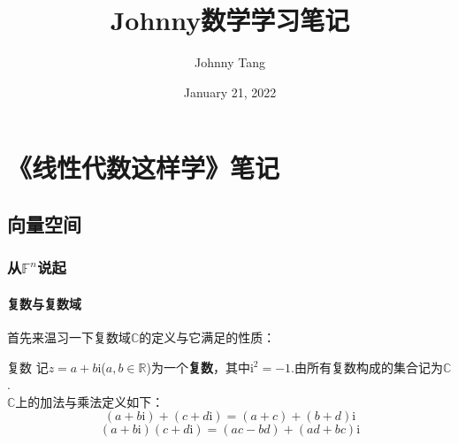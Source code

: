 \documentclass[lang=cn, zihao=5]{elegantbook}
\title{Johnny数学学习笔记}
\subtitle
\author{Johnny Tang}
\institute{DEEP Team}
\date{January 21, 2022}
\newcommand{\R}{\mathbb{R}}
\newcommand{\C}{\mathbb{C}}
\newcommand{\F}{\mathbb{F}}
\newcommand{\ic}{\text{i}}
\begin{document}
\maketitle

\frontmatter

\mainmatter

\tableofcontents

\part{《线性代数这样学》笔记}

\chapter{向量空间}

\section{从$\F ^{n}$说起}

\subsection{复数与复数域}

首先来温习一下复数域$\C$的定义与它满足的性质：

\begin{definition}{复数}
	记$z=a+b\ic $($a,b \in \R$)为一个\textbf{复数}，其中$\ic ^2=-1$.由所有复数构成的集合记为$\C$. \\
	$\C$上的加法与乘法定义如下：
	$$(a+b\ic ) + (c+d\ic ) = (a+c) + (b+d)\ic $$
	$$(a+b\ic )(c+d\ic ) = (ac-bd) + (ad+bc)\ic $$
\end{definition}
\end{document}
